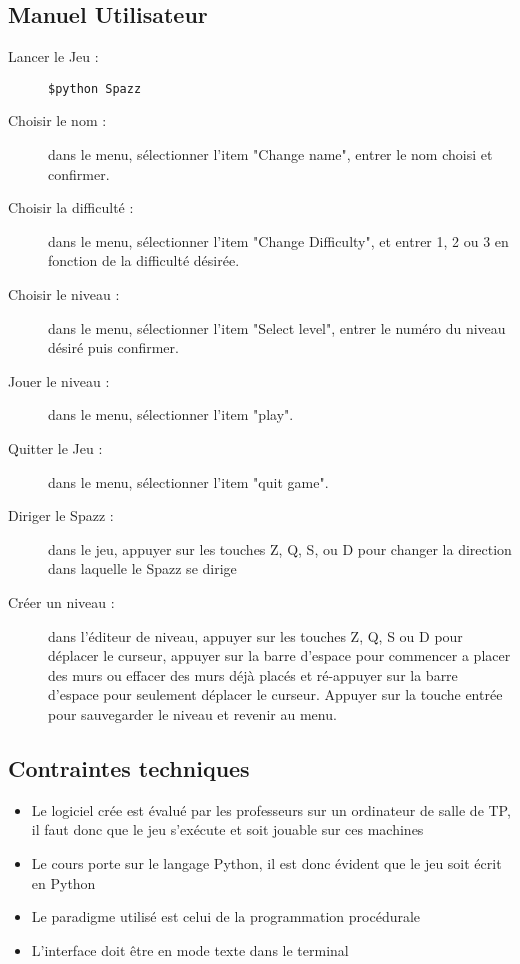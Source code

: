 \documentclass[a4paper,11pt]{scrartcl}
\begin{document}
\subsection{Manuel Utilisateur}

\begin{description}
    \item [Lancer le Jeu : ] \texttt{\$python Spazz}
	\item [Choisir le nom : ] dans le menu, sélectionner l'item "Change name", entrer le nom choisi et confirmer.
    \item [Choisir la difficulté : ] dans le menu, sélectionner l'item "Change Difficulty", et entrer 1, 2 ou 3 en fonction de la difficulté désirée.
    \item [Choisir le niveau : ] dans le menu, sélectionner l'item "Select level", entrer le numéro du niveau désiré puis confirmer.
    \item [Jouer le niveau : ] dans le menu, sélectionner l'item "play".
    \item [Quitter le Jeu : ] dans le menu, sélectionner l'item "quit game".
    \item [Diriger le Spazz : ] dans le jeu, appuyer sur les touches Z, Q, S, ou D pour changer la direction dans laquelle le Spazz se dirige
    \item [Créer un niveau : ] dans l'éditeur de niveau, appuyer sur les touches Z, Q, S ou D pour déplacer le curseur, appuyer sur la barre d'espace pour commencer a placer des murs ou effacer des murs déjà placés et ré-appuyer sur la barre d'espace pour seulement déplacer le curseur. Appuyer sur la touche entrée pour sauvegarder le niveau et revenir au menu.
\end{description}

\subsection{Contraintes techniques}

\begin{itemize}[label = $\bullet$]
	\item Le logiciel crée est évalué par les professeurs sur un ordinateur de salle de TP, il faut donc que le jeu s’exécute et soit jouable sur ces machines
	\item Le cours porte sur le langage Python, il est donc évident que le jeu soit écrit en Python
	\item Le paradigme utilisé est celui de la programmation procédurale
	\item L'interface doit être en mode texte dans le terminal
\end{itemize}
\end{document}
